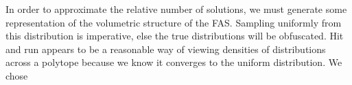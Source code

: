 \begin{methods}
In order to approximate the relative number of solutions, we must generate some representation of the volumetric structure of the FAS. Sampling uniformly from this distribution is imperative, else the true distributions will be obfuscated. Hit and run appears to be a reasonable way of viewing densities of distributions across a polytope because we know it converges to the uniform distribution. We chose
\end{methods}